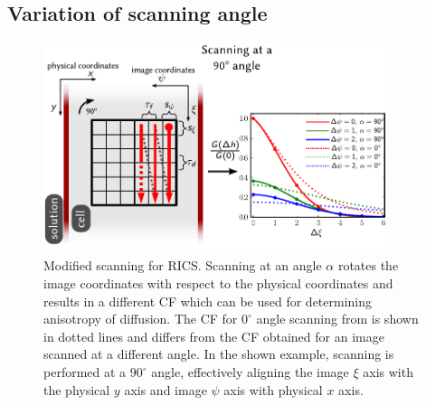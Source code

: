 \subsection{Variation of scanning angle}
\begin{figure}[b!]
  \centering
    \includegraphics[width=10cm]{figures/rics_theory_3.pdf}
    \caption[Extended \acs{RICS}: scanning at an angle]{
    Modified scanning for \acs{RICS}. Scanning at an angle
    $\alpha$ rotates the image coordinates with respect to the physical
    coordinates and results in a different \ac{CF} which can be used for
    determining anisotropy of diffusion. The
    \ac{CF} for $0^\circ$ angle scanning from \F{~\ref{fig:rics_theory2}} is shown in dotted lines and differs from
    the \ac{CF} obtained for an image scanned at a different angle. In the
    shown example, scanning is performed at a $90^\circ$ angle,
    effectively aligning the image $\xi$ axis with the physical $y$ axis
    and image $\psi$ axis with physical $x$ axis. 
    }
  \label{fig:rics_theory3}
\end{figure}

